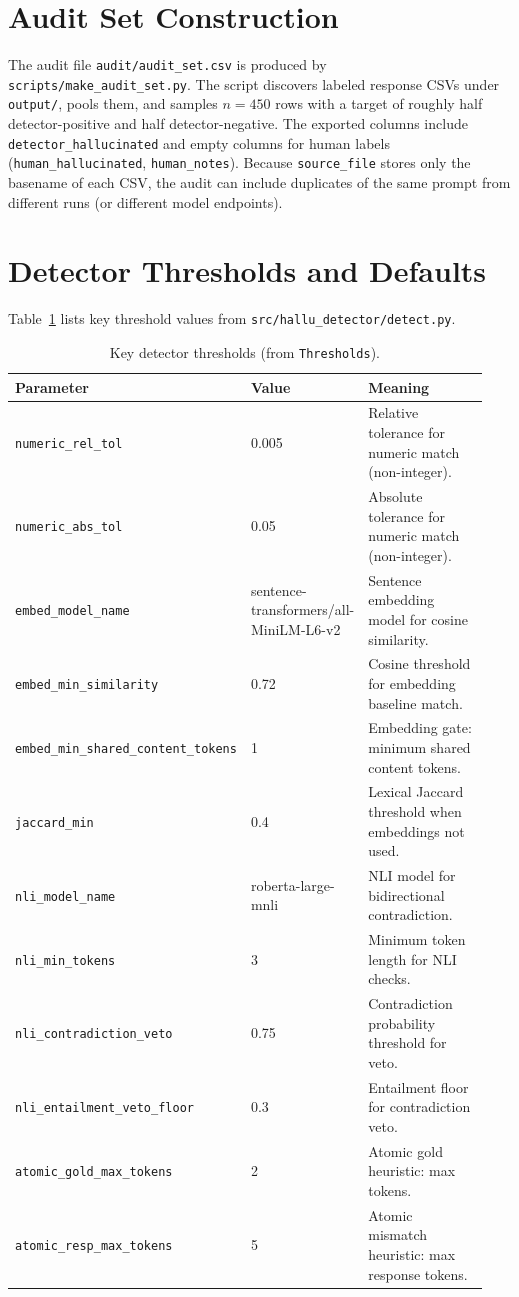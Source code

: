 \documentclass[11pt]{article}
\begin{document}
\appendix
\section{Audit Set Construction}
The audit file \texttt{audit/audit\_set.csv} is produced by \texttt{scripts/make\_audit\_set.py}. The script discovers labeled response CSVs under \texttt{output/}, pools them, and samples \(n=450\) rows with a target of roughly half detector-positive and half detector-negative. The exported columns include \texttt{detector\_hallucinated} and empty columns for human labels (\texttt{human\_hallucinated}, \texttt{human\_notes}). Because \texttt{source\_file} stores only the basename of each CSV, the audit can include duplicates of the same prompt from different runs (or different model endpoints).

\section{Detector Thresholds and Defaults}
Table~\ref{tab:thresholds} lists key threshold values from \texttt{src/hallu\_detector/detect.py}.

\begin{table}[h]
\centering
\caption{Key detector thresholds (from \texttt{Thresholds}).}
\label{tab:thresholds}
\begin{tabular}{p{0.28\linewidth}p{0.18\linewidth}p{0.48\linewidth}}
\toprule
\textbf{Parameter} & \textbf{Value} & \textbf{Meaning} \\
\midrule
\texttt{numeric\_rel\_tol} & 0.005 & Relative tolerance for numeric match (non-integer). \\
\texttt{numeric\_abs\_tol} & 0.05 & Absolute tolerance for numeric match (non-integer). \\
\texttt{embed\_model\_name} & sentence-transformers/all-MiniLM-L6-v2 & Sentence embedding model for cosine similarity. \\
\texttt{embed\_min\_similarity} & 0.72 & Cosine threshold for embedding baseline match. \\
\texttt{embed\_min\_shared\_content\_tokens} & 1 & Embedding gate: minimum shared content tokens. \\
\texttt{jaccard\_min} & 0.4 & Lexical Jaccard threshold when embeddings not used. \\
\texttt{nli\_model\_name} & roberta-large-mnli & NLI model for bidirectional contradiction. \\
\texttt{nli\_min\_tokens} & 3 & Minimum token length for NLI checks. \\
\texttt{nli\_contradiction\_veto} & 0.75 & Contradiction probability threshold for veto. \\
\texttt{nli\_entailment\_veto\_floor} & 0.3 & Entailment floor for contradiction veto. \\
\texttt{atomic\_gold\_max\_tokens} & 2 & Atomic gold heuristic: max tokens. \\
\texttt{atomic\_resp\_max\_tokens} & 5 & Atomic mismatch heuristic: max response tokens. \\
\bottomrule
\end{tabular}
\end{table}
\end{document}
